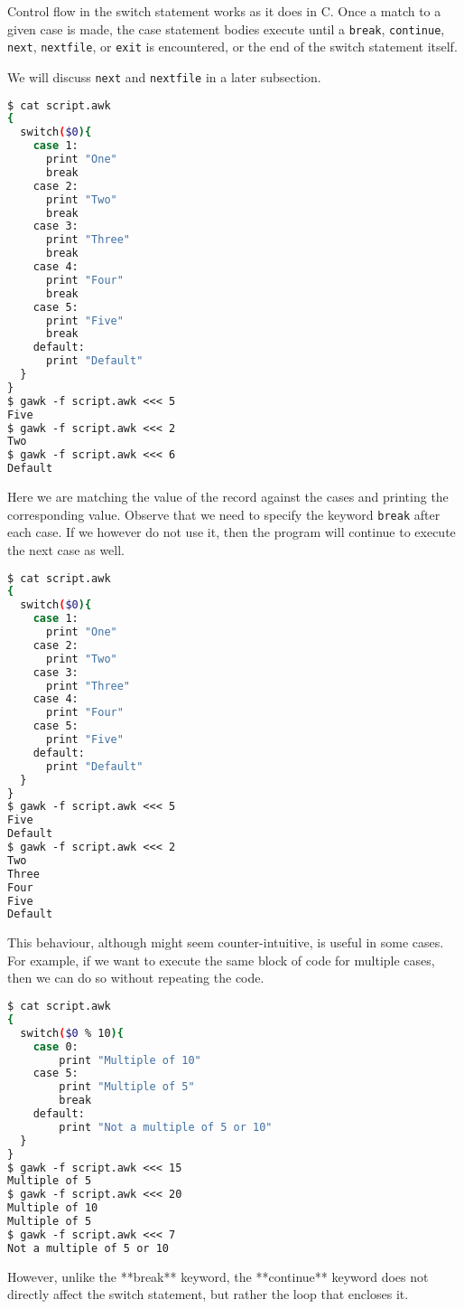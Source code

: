Control flow in the switch statement works as it does in C.
Once a match to a given case is made, the case statement bodies execute until a \lstinline|break|,
\lstinline|continue|, \lstinline|next|, \lstinline|nextfile|, or \lstinline|exit| is encountered,
or the end of the switch statement itself.

We will discuss \lstinline|next| and \lstinline|nextfile| in a later subsection.

\begin{lstlisting}[language=bash]
$ cat script.awk
{
  switch($0){
    case 1:
      print "One"
      break
    case 2:
      print "Two"
      break
    case 3:
      print "Three"
      break
    case 4:
      print "Four"
      break
    case 5:
      print "Five"
      break
    default:
      print "Default"
  }
}
$ gawk -f script.awk <<< 5
Five
$ gawk -f script.awk <<< 2
Two
$ gawk -f script.awk <<< 6
Default
\end{lstlisting}

Here we are matching the value of the record against the cases and printing the corresponding value.
Observe that we need to specify the keyword \lstinline|break| after each case.
If we however do not use it, then the program will continue to execute the next case as well.

\begin{lstlisting}[language=bash]
$ cat script.awk
{
  switch($0){
    case 1:
      print "One"
    case 2:
      print "Two"
    case 3:
      print "Three"
    case 4:
      print "Four"
    case 5:
      print "Five"
    default:
      print "Default"
  }
}
$ gawk -f script.awk <<< 5
Five
Default
$ gawk -f script.awk <<< 2
Two
Three
Four
Five
Default
\end{lstlisting}

This behaviour, although might seem counter-intuitive, is useful in some cases.
For example, if we want to execute the same block of code for multiple cases, then we can do so without repeating the code.

\begin{lstlisting}[language=bash]
$ cat script.awk
{
  switch($0 % 10){
    case 0: 
        print "Multiple of 10"
    case 5:
        print "Multiple of 5"
        break
    default:
        print "Not a multiple of 5 or 10"
  }
}
$ gawk -f script.awk <<< 15
Multiple of 5
$ gawk -f script.awk <<< 20
Multiple of 10
Multiple of 5
$ gawk -f script.awk <<< 7
Not a multiple of 5 or 10
\end{lstlisting}

However, unlike the **break** keyword, the **continue** keyword does not directly affect the switch statement, but rather the loop that encloses it.

